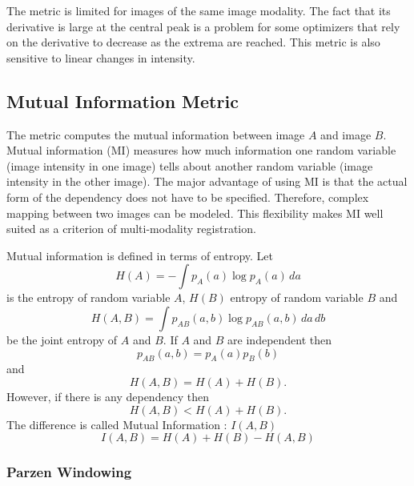 The metric is limited for images of the same image modality.  The
fact that its derivative is large at the central peak is a problem for some
optimizers that rely on the derivative to decrease as the extrema are
reached.  This metric is also sensitive to linear changes in intensity.


\subsection{Mutual Information Metric}
\label{sec:MutualInformationMetric}
The  metric computes the mutual
information between image $A$ and image $B$.  Mutual information (MI)
measures how much information one random variable (image intensity in one
image) tells about another random variable (image intensity in the other
image). The major advantage of using MI is that the actual form of the
dependency does not have to be specified.  Therefore, complex mapping between
two images can be modeled.  This flexibility makes MI well suited as a
criterion of multi-modality registration.

Mutual information is defined in terms of entropy. Let
\begin{equation}
H(A) = - \int p_A(a) \log p_A(a)\, da
\end{equation}
is the entropy of random variable $A$, $H(B)$ entropy of 
random variable $B$ and 
\begin{equation}
H(A,B) = \int p_{AB}(a,b) \log p_{AB}(a,b)\,da\,db
\end{equation}
be the joint entropy of $A$ and $B$. If $A$ and $B$ are independent then
\begin{equation}
p_{AB}(a,b) = p_A(a) p_B(b)
\end{equation}
and
\begin{equation}
H(A,B) = H(A) + H(B).
\end{equation}
However, if there is any dependency then
\begin{equation}
H(A,B)<H(A)+H(B).
\end{equation}
The difference is called Mutual Information : \( I(A,B) \)
\begin{equation}
I(A,B)=H(A)+H(B)-H(A,B)
\end{equation}

\subsubsection{Parzen Windowing}

